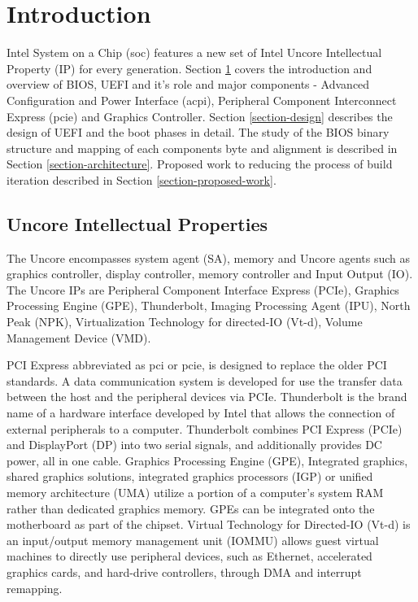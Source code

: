 \section{Introduction}\label{section-introduction}
Intel System on a Chip (\gls{soc}) features a new set of Intel Uncore Intellectual Property (IP) for every generation.
Section \ref{section-introduction} covers the introduction and overview of BIOS, UEFI and it's role and major components - Advanced Configuration and Power Interface (\gls{acpi}), Peripheral Component Interconnect Express (\gls{pcie}) and Graphics Controller. Section \ref{section-design} describes the design of UEFI and the boot phases in detail. The study of the BIOS binary structure and mapping of each components byte and alignment is described in Section \ref{section-architecture}. Proposed work to reducing the process of build iteration described in Section \ref{section-proposed-work}. 

\subsection{Uncore Intellectual Properties}
The Uncore encompasses system agent (SA), memory and Uncore agents such as graphics controller, display controller, memory controller and Input Output (IO). The Uncore IPs are Peripheral Component Interface Express (PCIe), Graphics Processing Engine (GPE), Thunderbolt, Imaging Processing Agent (IPU), North Peak (NPK), Virtualization Technology for directed-IO (Vt-d), Volume Management Device (VMD).

PCI Express abbreviated as \gls{pci} or \gls{pcie}, is designed to replace the older PCI standards.
A data communication system is developed for use the transfer data between the host and the
peripheral devices via PCIe. Thunderbolt is the brand name of a hardware interface developed
by Intel that allows the connection of external peripherals to a computer. Thunderbolt combines
PCI Express (PCIe) and DisplayPort (DP) into two serial signals, and additionally provides DC
power, all in one cable. Graphics Processing Engine (GPE), Integrated graphics, shared graphics
solutions, integrated graphics processors (IGP) or unified memory architecture (UMA) utilize a
portion of a computer's system RAM rather than dedicated graphics memory. GPEs can be
integrated onto the motherboard as part of the chipset. Virtual Technology for Directed-IO (Vt-d)
is an input/output memory management unit (IOMMU) allows guest virtual machines to directly
use peripheral devices, such as Ethernet, accelerated graphics cards, and hard-drive controllers,
through DMA and interrupt remapping.

